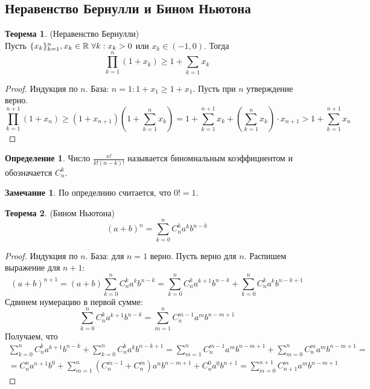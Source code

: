 \documentclass[a4paper, 12pt]{article}
\newcommand{\R}{\mathbb{R}}
\newcommand\tab[1][.5cm]{\hspace*{#1}}
\theoremstyle{definition}
\newtheorem*{definition}{Определение}
\newtheorem*{theorem}{Теорема}
\newtheorem*{comm}{Замечание}
\begin{document}
        \subsection{Неравенство Бернулли и Бином Ньютона}
        \begin{theorem} (Неравенство Бернулли)\\
            Пусть $\{x_k\}_{k=1}^n, x_k\in \R \tab[3pt] \forall k: x_k>0$ или $x_k\in (-1, 0)$. Тогда
            \[\prod\limits_{k=1}^n(1+x_k)\geq 1+\sum\limits_{k=1}x_k\]
        \end{theorem} 
        \begin{proof}
            Индукция по $n$.
            База: $n=1: 1+x_1\geq 1+x_1$.
            Пусть при $n$ утверждение верно.
            \[\prod\limits_{k=1}^{n+1}(1+x_n)\geq(1+x_{n+1})(1+\sum\limits_{k=1}^nx_k)=1+\sum\limits_{k=1}^{n+1}x_k+(\sum\limits_{k=1}^{n}x_k)\cdot x_{n+1}> 1+\sum\limits_{k=1}^{n+1}x_n\]
        \end{proof}
        \begin{definition}
            Число $\frac{n!}{k!(n-k)!}$ называется биномиальным коэффициентом и обозначается $C_n^k$.
        \end{definition} 
        \begin{comm}
            По определнию считается, что $0!=1$.
        \end{comm} 
        \begin{theorem} (Бином Ньютона)
            \[(a+b)^n=\sum\limits_{k=0}^n C_n^k a^k b^{n-k}\]
        \end{theorem} 
        \begin{proof}
            Индукция по $n$. База: для $n=1$ верно. Пусть верно для $n$. Распишем выражение для $n+1$:
            \[(a+b)^{n+1}=(a+b)\sum\limits_{k=0}^n C_n^k a^k b^{n-k}=\sum\limits_{k=0}^n C_n^k a^{k+1} b^{n-k}+\sum\limits_{k=0}^n C_n^k a^k b^{n-k+1}\]
            Сдвинем нумерацию в первой сумме:
            \[\sum\limits_{k=0}^n C_n^k a^{k+1} b^{n-k}=\sum\limits_{m=1}^n C_n^{m-1} a^{m} b^{n-m+1}\]
            Получаем, что
            \begin{multline*}
            \sum\limits_{k=0}^n C_n^k a^{k+1} b^{n-k}+\sum\limits_{k=0}^n C_n^k a^k b^{n-k+1}=\sum\limits_{m=1}^n C_n^{m-1} a^{m} b^{n-m+1}+\sum\limits_{m=0}^n C_n^m a^m b^{n-m+1}=\\=C_n^n a^{n+1}b^0+\sum\limits_{m=1}^n(C_n^{m-1}+C_n^m)a^n b^{n-m+1}+C_n^0a^0b^{n+1}=\sum\limits_{m=0}^{n+1}C_{n+1}^m a^m b^{n-m+1}
            \end{multline*}
        \end{proof} 
\end{document}
